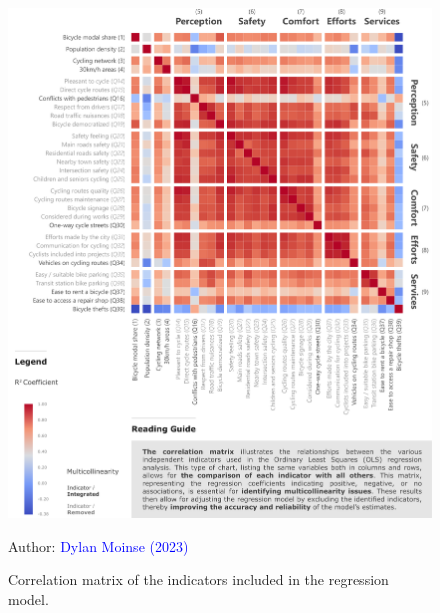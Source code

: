 \begin{refsegment}
\begin{figure}[h!]\vspace*{4pt}
    \caption{Correlation matrix of the indicators included in the regression model.}
    \label{fig-chap4:matrice-autocorrelation}
    \centerline{\includegraphics[width=1\columnwidth]{src/Figures/Chap-4/EN_Matrice_Autocorrelation_OLS.pdf}}
    \vspace{5pt}
    \begin{flushright}\scriptsize{
    Author: \textcolor{blue}{Dylan Moinse (2023)}
    }\end{flushright}
\end{figure}


\end{refsegment}
